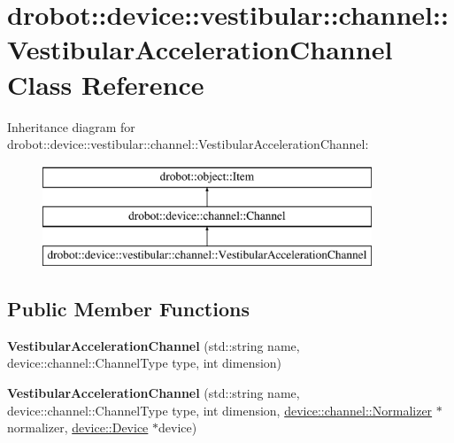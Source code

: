 \hypertarget{classdrobot_1_1device_1_1vestibular_1_1channel_1_1VestibularAccelerationChannel}{\section{drobot\-:\-:device\-:\-:vestibular\-:\-:channel\-:\-:Vestibular\-Acceleration\-Channel Class Reference}
\label{classdrobot_1_1device_1_1vestibular_1_1channel_1_1VestibularAccelerationChannel}
}
Inheritance diagram for drobot\-:\-:device\-:\-:vestibular\-:\-:channel\-:\-:Vestibular\-Acceleration\-Channel\-:\begin{figure}[H]
\begin{center}
\leavevmode
\includegraphics[height=3.000000cm]{classdrobot_1_1device_1_1vestibular_1_1channel_1_1VestibularAccelerationChannel}
\end{center}
\end{figure}
\subsection*{Public Member Functions}
\begin{DoxyCompactItemize}
\item 
\hypertarget{classdrobot_1_1device_1_1vestibular_1_1channel_1_1VestibularAccelerationChannel_adc027740e41e222a613eca7d807e4aee}{{\bfseries Vestibular\-Acceleration\-Channel} (std\-::string name, device\-::channel\-::\-Channel\-Type type, int dimension)}\label{classdrobot_1_1device_1_1vestibular_1_1channel_1_1VestibularAccelerationChannel_adc027740e41e222a613eca7d807e4aee}

\item 
\hypertarget{classdrobot_1_1device_1_1vestibular_1_1channel_1_1VestibularAccelerationChannel_a6fb3557ab90c04628fe62f083fe98a71}{{\bfseries Vestibular\-Acceleration\-Channel} (std\-::string name, device\-::channel\-::\-Channel\-Type type, int dimension, \hyperlink{classdrobot_1_1device_1_1channel_1_1Normalizer}{device\-::channel\-::\-Normalizer} $\ast$normalizer, \hyperlink{classdrobot_1_1device_1_1Device}{device\-::\-Device} $\ast$device)}\label{classdrobot_1_1device_1_1vestibular_1_1channel_1_1VestibularAccelerationChannel_a6fb3557ab90c04628fe62f083fe98a71}

\end{DoxyCompactItemize}
